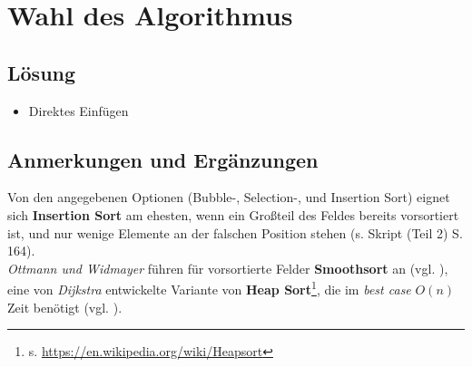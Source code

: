 \chapter{Wahl des Algorithmus}

\section*{Lösung}

\begin{itemize}
    \item Direktes Einfügen
\end{itemize}


\section*{Anmerkungen und Ergänzungen}

Von den angegebenen Optionen (Bubble-, Selection-, und Insertion Sort) eignet sich \textbf{Insertion Sort} am ehesten, wenn ein Großteil des Feldes bereits vorsortiert ist, und nur wenige Elemente an der falschen Position stehen (s. Skript (Teil 2) S. 164).\\

\textit{Ottmann und Widmayer} führen für vorsortierte Felder \textbf{Smoothsort} an (vgl. \cite[112]{OW17b}), eine von \textit{Dijkstra} entwickelte Variante von \textbf{Heap Sort}\footnote{
    s. \url{https://en.wikipedia.org/wiki/Heapsort}
}, die im \textit{best case} $O(n)$ Zeit benötigt (vgl. \cite{Dij81}).